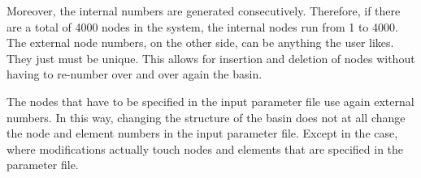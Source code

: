 Moreover, the internal numbers are generated consecutively.
Therefore, if there are a total of 4000 nodes in the system, the internal
nodes run from 1 to 4000. The external node numbers,
on the other side, can be anything the user likes. They just must be
unique. This allows for insertion and deletion of nodes without
having to re-number over and over again the basin.

The nodes that have to be specified in the input parameter file
use again external numbers. In this way, changing the structure of
the basin does not at all change the node and element numbers in the
input parameter file. Except in the case, where modifications
actually touch nodes and elements that are specified in the 
parameter file.

